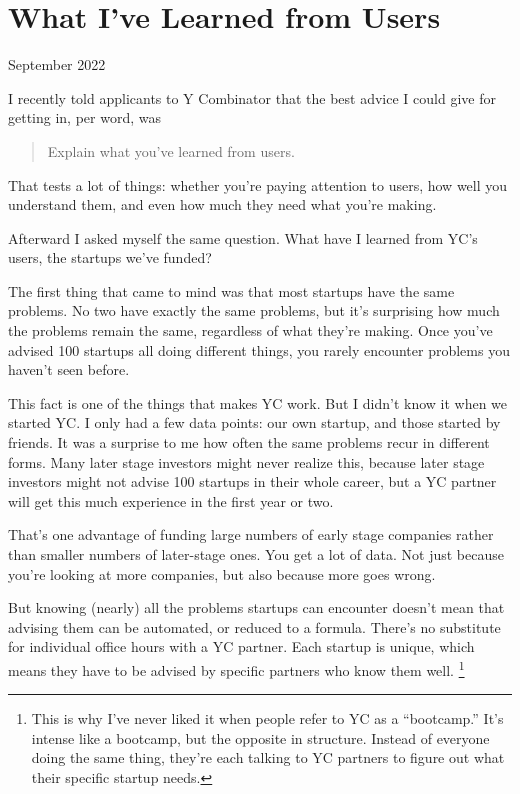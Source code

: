 \chapter{What I've Learned from Users}

September 2022

I recently told applicants to Y Combinator that the best advice I could
give for getting in, per word, was

\begin{quote}
Explain what you've learned from users.
\end{quote}

That tests a lot of things: whether you're paying attention to users,
how well you understand them, and even how much they need what you're
making.

Afterward I asked myself the same question. What have I learned from
YC's users, the startups we've funded?

The first thing that came to mind was that most startups have the same
problems. No two have exactly the same problems, but it's surprising how
much the problems remain the same, regardless of what they're making.
Once you've advised 100 startups all doing different things, you rarely
encounter problems you haven't seen before.

This fact is one of the things that makes YC work. But I didn't know it
when we started YC. I only had a few data points: our own startup, and
those started by friends. It was a surprise to me how often the same
problems recur in different forms. Many later stage investors might
never realize this, because later stage investors might not advise 100
startups in their whole career, but a YC partner will get this much
experience in the first year or two.

That's one advantage of funding large numbers of early stage companies
rather than smaller numbers of later-stage ones. You get a lot of data.
Not just because you're looking at more companies, but also because more
goes wrong.

But knowing (nearly) all the problems startups can encounter doesn't
mean that advising them can be automated, or reduced to a formula.
There's no substitute for individual office hours with a YC partner.
Each startup is unique, which means they have to be advised by specific
partners who know them well. \footnote{This is why I've never liked it when people refer to YC as a
``bootcamp.'' It's intense like a bootcamp, but the opposite in
structure. Instead of everyone doing the same thing, they're each
talking to YC partners to figure out what their specific startup needs.}

